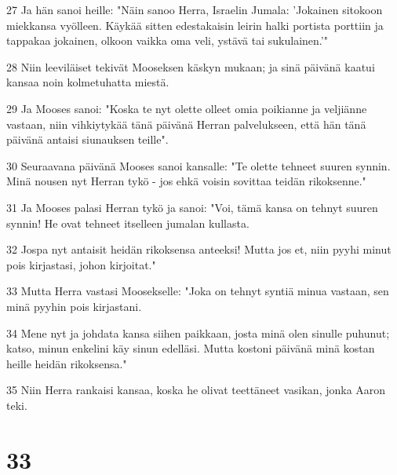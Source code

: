 \par 27 Ja hän sanoi heille: "Näin sanoo Herra, Israelin Jumala: 'Jokainen sitokoon miekkansa vyölleen. Käykää sitten edestakaisin leirin halki portista porttiin ja tappakaa jokainen, olkoon vaikka oma veli, ystävä tai sukulainen.'"
\par 28 Niin leeviläiset tekivät Mooseksen käskyn mukaan; ja sinä päivänä kaatui kansaa noin kolmetuhatta miestä.
\par 29 Ja Mooses sanoi: "Koska te nyt olette olleet omia poikianne ja veljiänne vastaan, niin vihkiytykää tänä päivänä Herran palvelukseen, että hän tänä päivänä antaisi siunauksen teille".
\par 30 Seuraavana päivänä Mooses sanoi kansalle: "Te olette tehneet suuren synnin. Minä nousen nyt Herran tykö - jos ehkä voisin sovittaa teidän rikoksenne."
\par 31 Ja Mooses palasi Herran tykö ja sanoi: "Voi, tämä kansa on tehnyt suuren synnin! He ovat tehneet itselleen jumalan kullasta.
\par 32 Jospa nyt antaisit heidän rikoksensa anteeksi! Mutta jos et, niin pyyhi minut pois kirjastasi, johon kirjoitat."
\par 33 Mutta Herra vastasi Moosekselle: "Joka on tehnyt syntiä minua vastaan, sen minä pyyhin pois kirjastani.
\par 34 Mene nyt ja johdata kansa siihen paikkaan, josta minä olen sinulle puhunut; katso, minun enkelini käy sinun edelläsi. Mutta kostoni päivänä minä kostan heille heidän rikoksensa."
\par 35 Niin Herra rankaisi kansaa, koska he olivat teettäneet vasikan, jonka Aaron teki.

\chapter{33}

